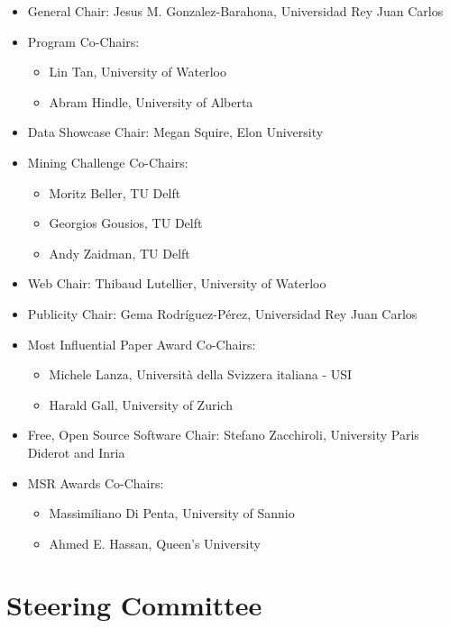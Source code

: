 \documentclass[a4paper]{report}
\begin{document}
\begin{itemize}
\item General Chair:
  Jesus M. Gonzalez-Barahona, Universidad Rey Juan Carlos

\item Program Co-Chairs:
  \begin{itemize}
  \item Lin Tan, University of Waterloo
  \item Abram Hindle, University of Alberta
  \end{itemize}

\item Data Showcase Chair: Megan Squire, Elon University

\item Mining Challenge Co-Chairs:
  \begin{itemize}
  \item Moritz Beller, TU Delft
  \item Georgios Gousios, TU Delft
  \item Andy Zaidman, TU Delft
  \end{itemize}
  
\item Web Chair: Thibaud Lutellier, University of Waterloo

\item Publicity Chair: Gema Rodríguez-Pérez, Universidad Rey Juan Carlos

\item Most Influential Paper Award Co-Chairs:
  \begin{itemize}
  \item Michele Lanza, Università della Svizzera italiana - USI
  \item Harald Gall, University of Zurich
  \end{itemize}
  
\item Free, Open Source Software Chair: Stefano Zacchiroli, University Paris Diderot and Inria

\item MSR Awards Co-Chairs:
  \begin{itemize}
  \item Massimiliano Di Penta, University of Sannio
  \item Ahmed E. Hassan, Queen's University
  \end{itemize}
\end{itemize}

\section{Steering Committee}
\end{document}
